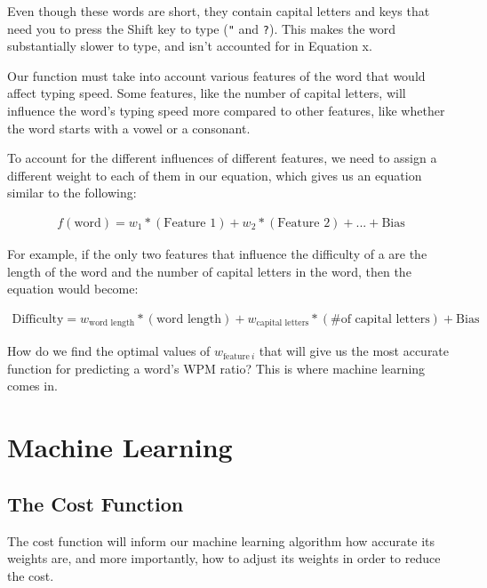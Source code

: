 \documentclass[12pt, demo]{article}
\newcommand{\code}[1]{\texttt{#1}}
\begin{document}

Even though these words are short, they contain capital letters and keys that need you to press the Shift key to type (\code{"} and \code{?}). This makes the word substantially slower to type, and isn't accounted for in Equation x.

Our function must take into account various features of the word that would affect typing speed. Some features, like the number of capital letters, will influence the word's typing speed more compared to other features, like whether the word starts with a vowel or a consonant.

To account for the different influences of different features, we need to assign a different weight to each of them in our equation, which gives us an equation similar to the following:

\begin{align*}
	f(\text{word}) = w_1 * (\text{Feature 1}) + w_2 * (\text{Feature 2}) + ... + \text{Bias}
\end{align*}

For example, if the only two features that influence the difficulty of a are the length of the word and the number of capital letters in the word, then the equation would become:

\begin{align*}
	\text{Difficulty} = w_{\text{word length}} * (\text{word length}) + w_{\text{capital letters}} * (\text{\# of capital letters}) + \text{Bias}
\end{align*}


How do we find the optimal values of $w_{\text{feature}~i}$ that will give us the most accurate function for predicting a word's WPM ratio? This is where machine learning comes in.

\section*{Machine Learning}

\subsection*{The Cost Function}

The cost function will inform our machine learning algorithm how accurate its weights are, and more importantly, how to adjust its weights in order to reduce the cost.
\end{document}
